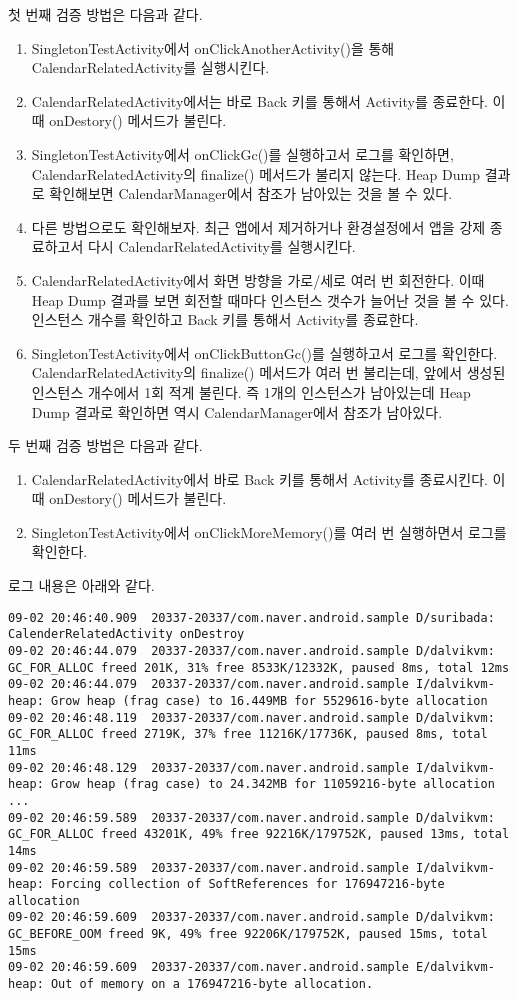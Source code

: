 첫 번째 검증 방법은 다음과 같다.
\begin{enumerate}
\item SingletonTestActivity에서 onClickAnotherActivity()을 통해 CalendarRelatedActivity를 실행시킨다.
\item CalendarRelatedActivity에서는 바로 Back 키를 통해서 Activity를 종료한다. 이때 onDestory() 메서드가 불린다.
\item SingletonTestActivity에서 onClickGc()를 실행하고서 로그를 확인하면, CalendarRelatedActivity의 finalize() 메서드가 불리지 않는다. Heap Dump 결과로 확인해보면 CalendarManager에서 참조가 남아있는 것을 볼 수 있다. 
\item 다른 방법으로도 확인해보자. 최근 앱에서 제거하거나 환경설정에서 앱을 강제 종료하고서 다시 CalendarRelatedActivity를 실행시킨다.
\item CalendarRelatedActivity에서 화면 방향을 가로/세로 여러 번 회전한다. 이때 Heap Dump 결과를 보면 회전할 때마다 인스턴스 갯수가 늘어난 것을 볼 수 있다. 인스턴스 개수를 확인하고 Back 키를 통해서 Activity를 종료한다.
\item SingletonTestActivity에서 onClickButtonGc()를 실행하고서 로그를 확인한다. CalendarRelatedActivity의 finalize() 메서드가 여러 번 불리는데, 앞에서 생성된 인스턴스 개수에서 1회 적게 불린다. 즉 1개의 인스턴스가 남아있는데 Heap Dump 결과로 확인하면 역시 CalendarManager에서 참조가 남아있다.
\end{enumerate}


두 번째 검증 방법은 다음과 같다.
\begin{enumerate}
\item CalendarRelatedActivity에서 바로 Back 키를 통해서 Activity를 종료시킨다. 이때 onDestory() 메서드가 불린다.
\item SingletonTestActivity에서 onClickMoreMemory()를 여러 번 실행하면서 로그를 확인한다.
\end{enumerate}

로그 내용은 아래와 같다.
\begin{lstlisting}[frame=single]
09-02 20:46:40.909  20337-20337/com.naver.android.sample D/suribada: CalenderRelatedActivity onDestroy
09-02 20:46:44.079  20337-20337/com.naver.android.sample D/dalvikvm: GC_FOR_ALLOC freed 201K, 31% free 8533K/12332K, paused 8ms, total 12ms
09-02 20:46:44.079  20337-20337/com.naver.android.sample I/dalvikvm-heap: Grow heap (frag case) to 16.449MB for 5529616-byte allocation
09-02 20:46:48.119  20337-20337/com.naver.android.sample D/dalvikvm: GC_FOR_ALLOC freed 2719K, 37% free 11216K/17736K, paused 8ms, total 11ms
09-02 20:46:48.129  20337-20337/com.naver.android.sample I/dalvikvm-heap: Grow heap (frag case) to 24.342MB for 11059216-byte allocation
...
09-02 20:46:59.589  20337-20337/com.naver.android.sample D/dalvikvm: GC_FOR_ALLOC freed 43201K, 49% free 92216K/179752K, paused 13ms, total 14ms
09-02 20:46:59.589  20337-20337/com.naver.android.sample I/dalvikvm-heap: Forcing collection of SoftReferences for 176947216-byte allocation
09-02 20:46:59.609  20337-20337/com.naver.android.sample D/dalvikvm: GC_BEFORE_OOM freed 9K, 49% free 92206K/179752K, paused 15ms, total 15ms
09-02 20:46:59.609  20337-20337/com.naver.android.sample E/dalvikvm-heap: Out of memory on a 176947216-byte allocation.
\end{lstlisting}

